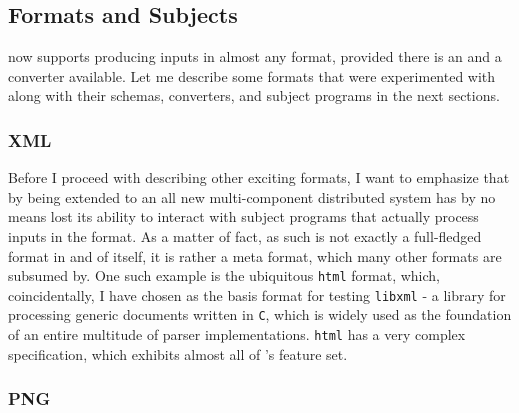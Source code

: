 \subsection{Formats and Subjects}
\xmlmate now supports producing inputs in almost any format, provided there is an \xsd and a converter
available. Let me describe some formats that were experimented with along with their schemas, converters, and
subject programs in the next sections.
\subsubsection{XML}
Before I proceed with describing other exciting formats, I want to emphasize that by being extended to an all
new multi-component distributed system \xmlmate has by no means lost its ability to interact with subject
programs that actually process inputs in the \xml format. As a matter of fact, \xml as such is not exactly a
full-fledged format in and of itself, it is rather a meta format, which many other formats are subsumed by. One
such example is the ubiquitous \texttt{html} format, which, coincidentally, I have chosen as the basis format
for testing \texttt{libxml} - a library for processing generic \xml documents written in \texttt{C}, which is
widely used as the foundation of an entire multitude of parser implementations. 
\texttt{html} has a very complex specification, which exhibits almost all of \xml's feature set.
\subsubsection{PNG}
 
